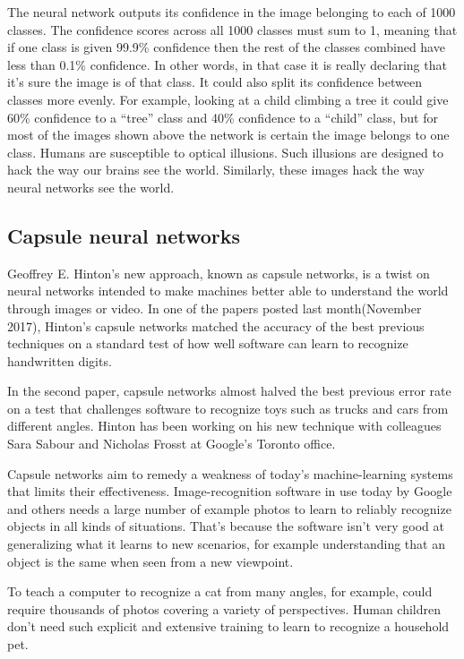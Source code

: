 \documentclass[12pt]{article}
\begin{document}
{{ The neural network outputs its confidence in the image belonging to each of 1000 classes. The confidence scores across all 1000 classes must sum to 1, meaning that if one class is given 99.9\% confidence then the rest of the classes combined have less than 0.1\% confidence. In other words, in that case it is really declaring that it’s sure the image is of that class. It could also split its confidence between classes more evenly. For example, looking at a child climbing a tree it could give 60\% confidence to a “tree” class and 40\% confidence to a “child” class, but for most of the images shown above the network is certain the image belongs to one class. Humans are susceptible to optical illusions. Such illusions are designed to hack the way our brains see the world. Similarly, these images hack the way neural networks see the world. 
\subsection{Capsule neural networks}

Geoffrey E. Hinton’s new approach, known as capsule networks, is a twist on neural networks intended to make machines better able to understand the world through images or video. In one of the papers posted last month(November 2017), Hinton’s capsule networks matched the accuracy of the best previous techniques on a standard test of how well software can learn to recognize handwritten digits.

In the second paper, capsule networks almost halved the best previous error rate on a test that challenges software to recognize toys such as trucks and cars from different angles. Hinton has been working on his new technique with colleagues Sara Sabour and Nicholas Frosst at Google’s Toronto office.

Capsule networks aim to remedy a weakness of today’s machine-learning systems that limits their effectiveness. Image-recognition software in use today by Google and others needs a large number of example photos to learn to reliably recognize objects in all kinds of situations. That’s because the software isn’t very good at generalizing what it learns to new scenarios, for example understanding that an object is the same when seen from a new viewpoint.

To teach a computer to recognize a cat from many angles, for example, could require thousands of photos covering a variety of perspectives. Human children don’t need such explicit and extensive training to learn to recognize a household pet.

}}
\end{document}
